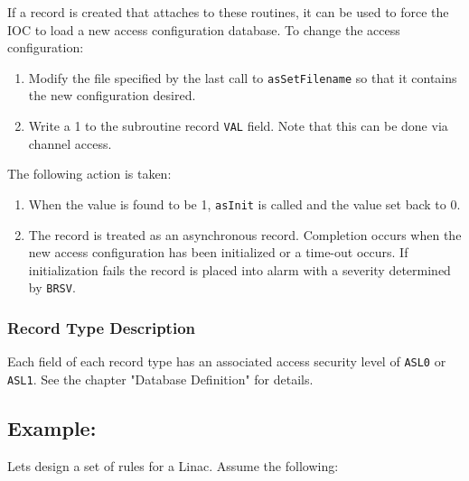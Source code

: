 If a record is created that attaches to these routines, it can be used to force the IOC to load a new access configuration 
database. To change the access configuration:

\begin{enumerate}\item Modify the file specified by the last call to \verb|asSetFilename| so that it contains the new configuration desired.

\item Write a 1 to the subroutine record \verb|VAL| field. Note that this can be done via channel access.

\end{enumerate}The following action is taken:

\begin{enumerate}\item When the value is found to be 1, \verb|asInit| is called and the value set back to 0.

\item The record is treated as an asynchronous record. Completion occurs when the new access configuration has been 
initialized or a time-out occurs. If initialization fails the record is placed into alarm with a severity determined by 
\verb|BRSV|.

\end{enumerate}\subsubsection{Record Type Description}

Each field of each record type has an associated access security level of \verb|ASL0| or \verb|ASL1|. See the chapter "Database 
Definition" for details.

\subsection{Example:}

Lets design a set of rules for a Linac. Assume the following:

